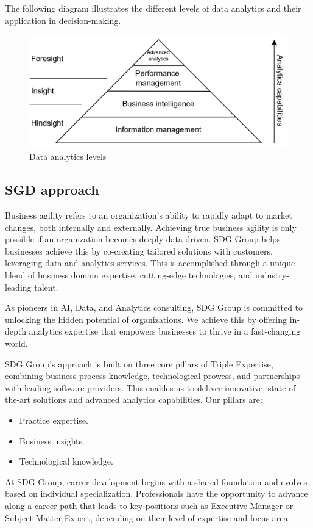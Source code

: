 The following diagram illustrates the different levels of data analytics and their application in decision-making.
\begin{figure}[H]
    \centering
    \includegraphics[width=0.5\linewidth]{images/bis5.png}
    \caption{Data analytics levels}
\end{figure}

\subsection{SGD approach}
Business agility refers to an organization's ability to rapidly adapt to market changes, both internally and externally. 
Achieving true business agility is only possible if an organization becomes deeply data-driven. 
SDG Group helps businesses achieve this by co-creating tailored solutions with customers, leveraging data and analytics services. 
This is accomplished through a unique blend of business domain expertise, cutting-edge technologies, and industry-leading talent.

As pioneers in AI, Data, and Analytics consulting, SDG Group is committed to unlocking the hidden potential of organizations. 
We achieve this by offering in-depth analytics expertise that empowers businesses to thrive in a fast-changing world.

SDG Group's approach is built on three core pillars of Triple Expertise, combining business process knowledge, technological prowess, and partnerships with leading software providers.
This enables us to deliver innovative, state-of-the-art solutions and advanced analytics capabilities. Our pillars are:
\begin{itemize}
    \item Practice expertise.
    \item Business insights.
    \item Technological knowledge.
\end{itemize}
\noindent At SDG Group, career development begins with a shared foundation and evolves based on individual specialization. 
Professionals have the opportunity to advance along a career path that leads to key positions such as Executive Manager or Subject Matter Expert, depending on their level of expertise and focus area.

